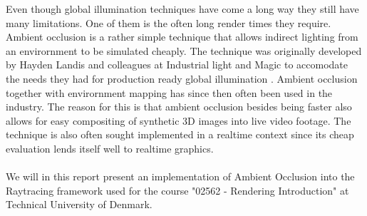 Even though global illumination techniques have come a long way they still have many limitations. One of them is the often long render times they require. Ambient occlusion is a rather simple technique that allows indirect lighting from an envirornment to be simulated cheaply. The technique was originally developed by Hayden Landis and colleagues at Industrial light and Magic to accomodate the needs they had for production ready global illumination \cite{Landis2002}. Ambient occlusion together with envirornment mapping has since then often been used in the industry. The reason for this is that ambient occlusion besides being faster also allows for easy compositing of synthetic 3D images into live video footage\cite{Landis2002}. The technique is also often sought implemented in a realtime context since its cheap evaluation lends itself well to realtime graphics\cite{Kontkanen:2005,Umenhoffer:2009, Shanmugam:2007}.
\\ \\
We will in this report present an implementation of Ambient Occlusion into the Raytracing framework used for the course "02562 - Rendering Introduction" at Technical University of Denmark.